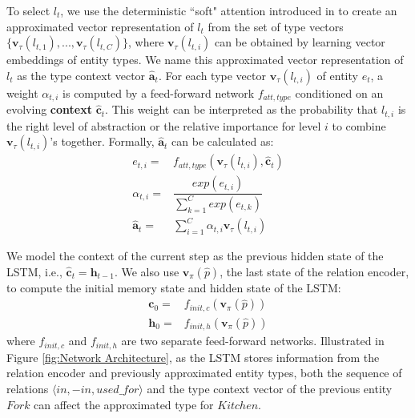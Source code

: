 \documentclass[letterpaper]{article} %
\begin{document}
To select $l_t$, we use the deterministic ``soft" attention introduced in \cite{ntm} to create an approximated vector representation of $l_t$ from the set of type vectors $\{\bm{v}_\tau(l_{t,1}),...,\bm{v}_\tau(l_{t,C})\}$, where $\bm{v}_\tau(l_{t,i})$ can be obtained by learning vector embeddings of entity types. We name this approximated vector representation of $l_t$ as the type context vector $\hat{\mathbf{a}}_t$. For each type vector $\bm{v}_\tau(l_{t,i})$ of entity $e_t$, a weight $\alpha_{t,i}$ is computed by a feed-forward network $f_{att, type}$ conditioned on an evolving \textbf{context} $\hat{\mathbf{c}}_t$. This weight can be interpreted as the probability that $l_{t,i}$ is the right level of abstraction or the relative importance for level $i$ to combine $\bm{v}_\tau(l_{t,i})$'s together. Formally, $\hat{\mathbf{a}}_t$ can be calculated as:%
\begin{align}
	e_{t,i} =& f_{att, type}(\bm{v}_\tau(l_{t,i}), \hat{\mathbf{c}}_t) \\
	\alpha_{t,i} =& \dfrac{exp(e_{t,i})}{\sum_{k=1}^{C} exp(e_{t,k})}\\
	\hat{\mathbf{a}}_t =& \sum_{i=1}^{C} \alpha_{t,i} \bm{v}_\tau(l_{t,i})
\end{align} %

We model the context of the current step as the previous hidden state of the LSTM, i.e., $\hat{\mathbf{c}}_t = \bm{h}_{t-1}$. 
We also use $\bm{v}_\pi(\hat{p})$, the last state of the relation encoder, to compute the initial memory state and hidden state of the LSTM:%
\begin{align}
	\bm{c}_0 =& f_{init, c}(\bm{v}_\pi(\hat{p})) \\
	\bm{h}_0 =& f_{init, h}(\bm{v}_\pi(\hat{p}))
\end{align} %
where $f_{init, c}$ and $f_{init, h}$ are two separate feed-forward networks. Illustrated in Figure \ref{fig:Network Architecture}, as the LSTM stores information from the relation encoder and previously approximated entity types, both the sequence of relations $\langle in, -in, used\_for \rangle$ and the type context vector of the previous entity $Fork$ can affect the approximated type for $Kitchen$. 
\end{document}
